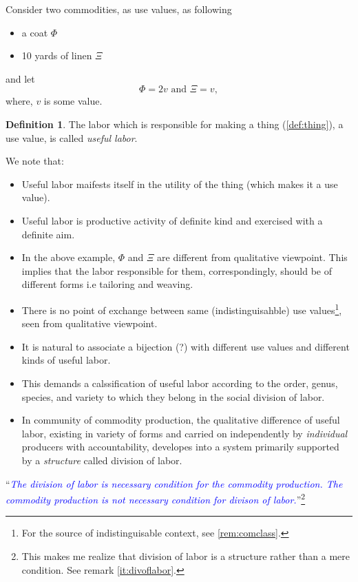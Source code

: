 \documentclass[12pt]{extarticle}
\theoremstyle{definition}
\newtheorem{definition}{Definition}[section]
\newenvironment{remark}[1][Remark]{\begin{trivlist}
\item[\hskip \labelsep {\bfseries #1}]}{\end{trivlist}}
\begin{document}
Consider two commodities, as use values, as following
\begin{itemize}
\item a coat $\Phi$
\item 10 yards of linen $\Xi$
\end{itemize}
and let
\begin{equation}
  \Phi = 2v \text{ and } \Xi = v,
\end{equation}
where, $v$ is some value.

\begin{definition}
  \label{def:usefullabor}
  The labor which is responsible for making a thing (\ref{def:thing}), a use value, is called \emph{useful labor}.
\end{definition}

\begin{remark}
  We note that:
  \begin{itemize}
  \item Useful labor maifests itself in the utility of the thing (which makes it a use value).
    \item Useful labor is productive activity of definite kind and exercised with a definite aim.
  \item In the above example, $\Phi$ and $\Xi$ are different from qualitative viewpoint.  This implies that the labor responsible for them, correspondingly, should be of different forms i.e tailoring and weaving.
  \item There is no point of exchange between same (indistinguisahble) use values\footnote{For the source of indistinguisable context, see \ref{rem:comclass}.}, seen from qualitative viewpoint.
  \item It is natural to associate a bijection (?) with different use values and different kinds of useful labor.
  \item This demands a calssification of useful labor according to the order, genus, species, and variety to which they belong in the social division of labor.
    \item\label{it:divoflabor}  In community of commodity production, the qualitative difference of useful labor, existing in variety of forms and carried on independently by \emph{individual} producers with accountability, developes into a system primarily supported by a \emph{structure} called division of labor.
  \end{itemize}
\end{remark}


``\emph{\textcolor{blue}{The division of labor is necessary condition for the commodity production.  The commodity production is not necessary condition for divison of labor.}}''\footnote{This makes me realize that division of labor is a structure rather than a mere condition.  See remark \ref{it:divoflabor}.}
\end{document}
